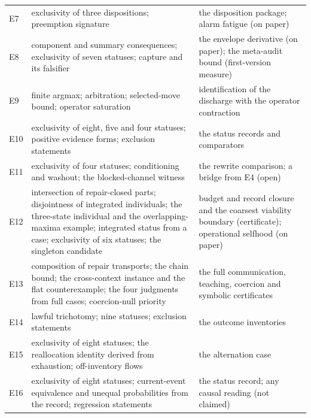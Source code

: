 {\begin{longtable}{@{}l>{\raggedright\arraybackslash}p{6.6cm}>{\raggedright\arraybackslash}p{6.8cm}@{}}
E7 & exclusivity of three dispositions; preemption signature & the disposition package; alarm fatigue
(on paper) \\
E8 & component and summary consequences; exclusivity of seven statuses; capture and its falsifier &
the envelope derivative (on paper); the meta-audit bound (first-version measure) \\
E9 & finite argmax; arbitration; selected-move bound; operator saturation & identification of the
discharge with the operator contraction \\
E10 & exclusivity of eight, five and four statuses; positive evidence forms; exclusion statements &
the status records and comparators \\
E11 & exclusivity of four statuses; conditioning and washout; the blocked-channel witness & the rewrite
comparison; a bridge from E4 (open) \\
E12 & intersection of repair-closed parts; disjointness of integrated individuals; the three-state
individual and the overlapping-maxima example; integrated status from a case; exclusivity of six
statuses; the singleton candidate & budget and record closure and the coarsest viability boundary
(certificate); operational selfhood (on paper) \\
E13 & composition of repair transports; the chain bound; the cross-context instance and the flat
counterexample; the four judgments from full cases; coercion-null priority & the full communication,
teaching, coercion and symbolic certificates \\
E14 & lawful trichotomy; nine statuses; exclusion statements & the outcome inventories \\
E15 & exclusivity of eight statuses; the reallocation identity derived from exhaustion; off-inventory
flows & the alternation case \\
E16 & exclusivity of eight statuses; current-event equivalence and unequal probabilities from the
record; regression statements & the status record; any causal reading (not claimed) \\
\end{longtable}
}
